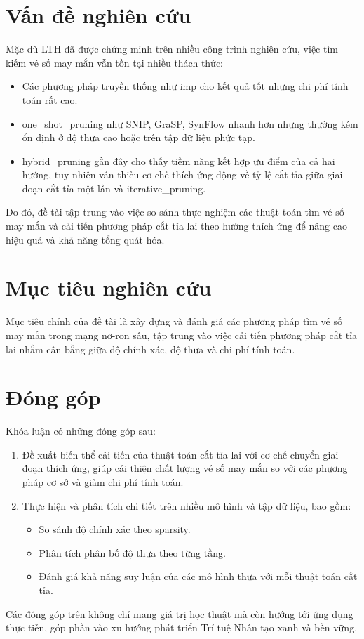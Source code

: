 \section{Vấn đề nghiên cứu}
Mặc dù LTH đã được chứng minh trên nhiều công trình nghiên cứu, việc tìm kiếm vé số may mắn vẫn tồn tại nhiều thách thức:
\begin{itemize}
    \item Các phương pháp truyền thống như \gls{imp} cho kết quả tốt nhưng chi phí tính toán rất cao.
    \item \gls{one_shot_pruning} như SNIP, GraSP, SynFlow nhanh hơn nhưng thường kém ổn định ở độ thưa cao hoặc trên tập dữ liệu phức tạp.
    \item \gls{hybrid_pruning} gần đây cho thấy tiềm năng kết hợp ưu điểm của cả hai hướng, tuy nhiên vẫn thiếu cơ chế thích ứng động về tỷ lệ cắt tỉa giữa giai đoạn cắt tỉa một lần và \gls{iterative_pruning}.
\end{itemize}

Do đó, đề tài tập trung vào việc so sánh thực nghiệm các thuật toán tìm vé số may mắn và cải tiến phương pháp cắt tỉa lai theo hướng thích ứng để nâng cao hiệu quả và khả năng tổng quát hóa.

\section{Mục tiêu nghiên cứu}
Mục tiêu chính của đề tài là xây dựng và đánh giá các phương pháp tìm vé số may mắn trong mạng nơ-ron sâu, tập trung vào việc cải tiến phương pháp cắt tỉa lai nhằm cân bằng giữa độ chính xác, độ thưa và chi phí tính toán.

\section{Đóng góp}
Khóa luận có những đóng góp sau:

\begin{enumerate}
    \item Đề xuất biến thể cải tiến của thuật toán cắt tỉa lai với cơ chế chuyển giai đoạn thích ứng, giúp cải thiện chất lượng vé số may mắn so với các phương pháp cơ sở và giảm chi phí tính toán.
    \item Thực hiện và phân tích chi tiết trên nhiều mô hình và tập dữ liệu, bao gồm:
    \begin{itemize}
        \item So sánh độ chính xác theo \gls{sparsity}.
        \item Phân tích phân bố độ thưa theo từng tầng.
        \item Đánh giá khả năng suy luận của các mô hình thưa với mỗi thuật toán cắt tỉa.
    \end{itemize}
\end{enumerate}

Các đóng góp trên không chỉ mang giá trị học thuật mà còn hướng tới ứng dụng thực tiễn, góp phần vào xu hướng phát triển Trí tuệ Nhân tạo xanh và bền vững.
